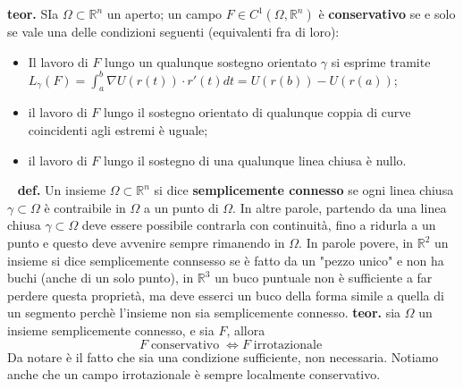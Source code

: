 \newline
\textbf{teor.} SIa $\Omega \subset \mathbb{R}^n$ un aperto; un campo $F \in C^1(\Omega,\mathbb{R}^n)$ è \textbf{conservativo} se e solo se vale una delle condizioni seguenti (equivalenti fra di loro):
\begin{itemize}
    \item Il lavoro di $F$ lungo un qualunque sostegno orientato $\gamma$ si esprime tramite $L_\gamma(F) = \int_{a}^{b}\nabla U(r(t)) \cdot r'(t) dt = U(r(b)) - U(r(a))$;
    \item il lavoro di $F$ lungo il sostegno orientato di qualunque coppia di curve coincidenti agli estremi è uguale;
    \item il lavoro di $F$ lungo il sostegno di una qualunque linea chiusa è nullo.
\end{itemize}
\ \newline
\textbf{def.} Un insieme $\Omega \subset \mathbb{R}^n$ si dice \textbf{semplicemente connesso} se ogni linea chiusa $\gamma \subset \Omega$ è contraibile in $\Omega$ a un punto di $\Omega$. In altre parole, partendo da una linea chiusa $\gamma \subset \Omega$ deve essere possibile contrarla con continuità, fino a ridurla a un punto e questo deve avvenire sempre rimanendo in $\Omega$.\newline
In parole povere, in $\mathbb{R}^2$ un insieme si dice semplicemente connsesso se è fatto da un "pezzo unico" e non ha buchi (anche di un solo punto), in $\mathbb{R}^3$ un buco puntuale non è sufficiente a far perdere questa proprietà, ma deve esserci un buco della forma simile a quella di un segmento perchè l'insieme non sia semplicemente connesso.\newline
\newline
\textbf{teor.} sia $\Omega$ un insieme semplicemente connesso, e sia $F$, allora
\[
    F \; \text{conservativo}\; \Longleftrightarrow F \; \text{irrotazionale}\;
\]
Da notare è il fatto che sia una condizione sufficiente, non necessaria.\newline
Notiamo anche che un campo irrotazionale è sempre localmente conservativo.
